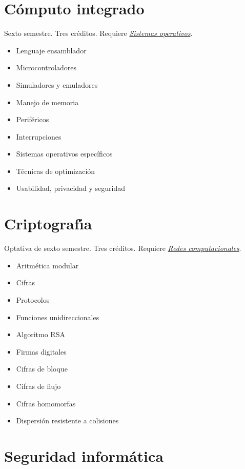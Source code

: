 \documentclass{article}
\begin{document}
\begin{multicols}{4}
\vfill\null \columnbreak

\hypertarget{ci}{\section*{C\'{o}mputo integrado}}  

Sexto semestre. Tres cr\'{e}ditos. Requiere \hyperlink{so}{\em
  Sistemas operativos}.

\begin{itemize}
\item{Lenguaje ensamblador}
\item{Microcontroladores}
\item{Simuladores y emuladores}
\item{Manejo de memoria}
\item{Perif\'{e}ricos}
\item{Interrupciones}
\item{Sistemas operativos espec\'{i}ficos}
\item{T\'{e}cnicas de optimizaci\'{o}n}
\item{Usabilidad, privacidad y seguridad}
\end{itemize}

\newpage

\hypertarget{cr}{\section*{Criptograf\'{\i}a}}

Optativa de sexto semestre. Tres cr\'{e}ditos. Requiere
\hyperlink{rc}{\em Redes computacionales}.

\begin{itemize}
\item{Aritm\'{e}tica modular}
\item{Cifras}
\item{Protocolos}
\item{Funciones unidireccionales}
\item{Algoritmo RSA}
\item{Firmas digitales}
\item{Cifras de bloque}
\item{Cifras de flujo}
\item{Cifras homomorfas}
\item{Dispersi\'{o}n resistente a colisiones}
\end{itemize}

\vfill\null \columnbreak

\hypertarget{si}{\section*{Seguridad inform\'{a}tica}} 


\end{multicols}
\end{document}
